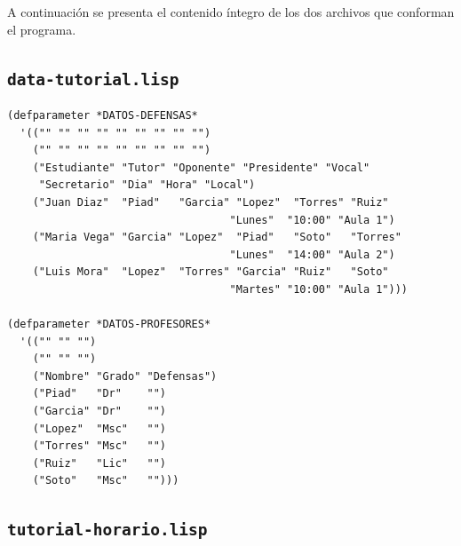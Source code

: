 \documentclass[12pt,a4paper]{report}
\begin{document}
A continuación se presenta el contenido íntegro de los dos archivos que
conforman el programa.

\subsection{\texttt{data-tutorial.lisp}}

\begin{lstlisting}[caption={data-tutorial.lisp --- datos de entrada.}]
(defparameter *DATOS-DEFENSAS*
  '(("" "" "" "" "" "" "" "" "")
    ("" "" "" "" "" "" "" "" "")
    ("Estudiante" "Tutor" "Oponente" "Presidente" "Vocal"
     "Secretario" "Dia" "Hora" "Local")
    ("Juan Diaz"  "Piad"   "Garcia" "Lopez"  "Torres" "Ruiz"
                                   "Lunes"  "10:00" "Aula 1")
    ("Maria Vega" "Garcia" "Lopez"  "Piad"   "Soto"   "Torres"
                                   "Lunes"  "14:00" "Aula 2")
    ("Luis Mora"  "Lopez"  "Torres" "Garcia" "Ruiz"   "Soto"
                                   "Martes" "10:00" "Aula 1")))

(defparameter *DATOS-PROFESORES*
  '(("" "" "")
    ("" "" "")
    ("Nombre" "Grado" "Defensas")
    ("Piad"   "Dr"    "")
    ("Garcia" "Dr"    "")
    ("Lopez"  "Msc"   "")
    ("Torres" "Msc"   "")
    ("Ruiz"   "Lic"   "")
    ("Soto"   "Msc"   "")))
\end{lstlisting}

\subsection{\texttt{tutorial-horario.lisp}}
\end{document}
